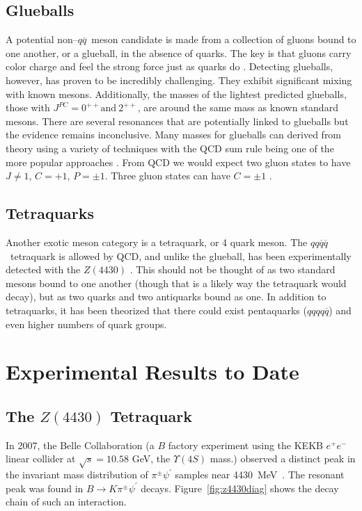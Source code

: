 \documentclass[aps,prd,twocolumn,nofootinbib]{revtex4-1}
\DeclareRobustCommand{\qqbar}{$q\overline{q}$}
\begin{document}
\subsection{Glueballs}
A potential non--\qqbar~meson candidate is made from a collection of gluons bound to one another, or a glueball, in the absence of quarks. The key is that gluons carry color charge and feel the strong force just as quarks do \cite{j1}. Detecting glueballs, however, has proven to be incredibly challenging. They exhibit significant mixing with known mesons. Additionally, the masses of the lightest predicted glueballs, those with $J^{PC} = 0^{++} \text{and}~2^{++}$, are around the same mass as known standard mesons. There are several resonances that are potentially linked to glueballs but the evidence remains inconclusive. Many masses for glueballs can derived from theory using a variety of techniques with the QCD sum rule being one of the more popular approaches \cite{j2}. From QCD we would expect two gluon states to have $J \neq 1$, $C = +1$, $P = \pm1$. Three gluon states can have $C = \pm1$ \cite{j3}.

\subsection{Tetraquarks}
Another exotic meson category is a tetraquark, or 4 quark meson. The $qq\overline{q}\overline{q}$~tetraquark is allowed by QCD, and unlike the glueball, has been experimentally detected with the $Z(4430)$ \cite{lhcb}. This should not be thought of as two standard mesons bound to one another (though that is a likely way the tetraquark would decay), but as two quarks and two antiquarks bound as one. In addition to tetraquarks, it has been theorized that there could exist pentaquarks ($qqqq\overline{q}$) and even higher numbers of quark groups.


\section{Experimental Results to Date}

\subsection{The $Z(4430)$ Tetraquark}
In 2007, the Belle Collaboration (a $B$ factory experiment using the KEKB $e^+e^-$ linear collider at $\sqrt{s} = 10.58$ GeV, the $\Upsilon(4S)$ mass.) observed a distinct peak in the invariant mass distribution of $\pi^{\pm}\psi^{\prime}$ samples near 4430~MeV~\cite{belle}. The resonant peak was found in $B\rightarrow K \pi^{\pm}\psi^{\prime}$ decays. Figure~\ref{fig:z4430diag} shows the decay chain of such an interaction.
\end{document}
